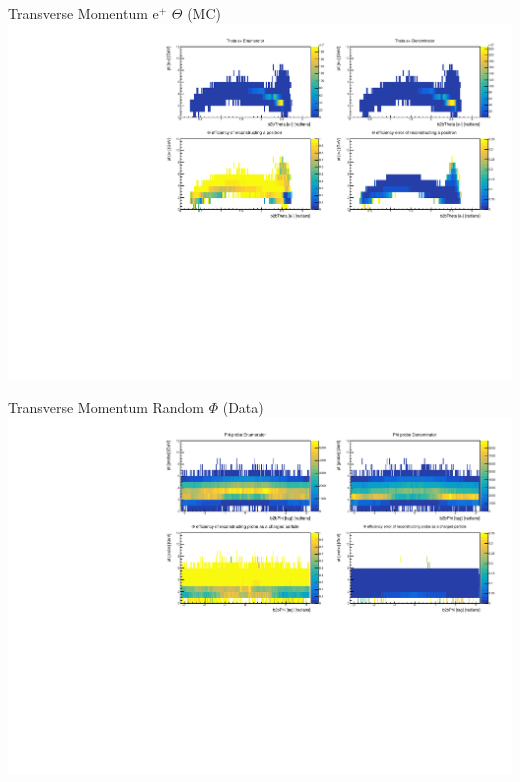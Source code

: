 \documentclass[10pt]{beamer}
\begin{document}
\begin{frame}{Transverse Momentum $\textrm{e}^+$ $\Theta$ (MC)}
	\centering
	\includegraphics[width=\textwidth]{Momentum/tMThetaep_MC}
\end{frame}


\begin{frame}{Transverse Momentum Random $\Phi$ (Data)}
	\centering
	\includegraphics[width=\textwidth]{Momentum/tMPhiRandom_Data}
\end{frame}
\end{document}
